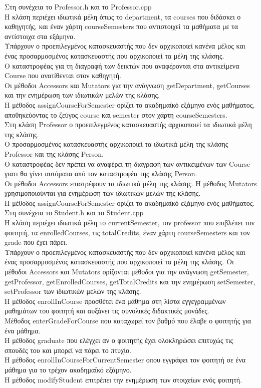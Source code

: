 \documentclass[12pt]{article}
\begin{document}
Στη συνέχεια το Professor.h και το Professor.cpp\\
Η κλάση περιέχει ιδιωτικά μέλη όπως το department, τα courses που διδάσκει ο καθηγητής, και έναν χάρτη courseSemesters που αντιστοιχεί τα μαθήματα με τα αντίστοιχα στα εξάμηνα.\\
Υπάρχουν ο προεπιλεγμένος κατασκευαστής που δεν αρχικοποιεί κανένα μέλος και ένας προσαρμοσμένος κατασκευαστής που αρχικοποιεί τα μέλη της κλάσης.\\
Ο καταστροφέας για τη διαγραφή των δεικτών που αναφέρονται στα αντικείμενα Course που ανατίθενται στον καθηγητή.\\
Οι μέθοδοι Accessors και Mutators για την ανάγνωση getDepartment, getCourses  και την ενημέρωση των ιδιωτικών μελών της κλάσης.\\
Η μέθοδος assignCourseForSemester ορίζει το ακαδημαϊκό εξάμηνο ενός μαθήματος, αποθηκεύοντας το ζεύγος course και semester στον χάρτη courseSemesters.\\
Στη κλάση Professor ο προεπιλεγμένος κατασκευαστής αρχικοποιεί τα ιδιωτικά μέλη της κλάσης.\\
Ο προσαρμοσμένος κατασκευαστής αρχικοποιεί τα ιδιωτικά μέλη της κλάσης Professor και της κλάσης Person.\\
Ο καταστροφέας δεν πρέπει να αναφέρει τη διαγραφή των αντικειμένων των Course γιατι θα γίνει αυτόματα από τον καταστροφέα της κλάσης Person.\\
Οι μέθοδοι Accessors επιστρέφουν τα ιδιωτικά μέλη της κλάσης.
Η μέθοδος Mutators χρησιμοποιούνται για ενημέρωση των ιδιωτικών μελών της κλάσης.\\
Η μέθοδος assignCourseForSemester ορίζει το ακαδημαϊκό εξάμηνο ενός μαθήματος.\\

Στη συνέχεια το Student.h και το Student.cpp\\
Η κλάση περιέχει ιδιωτικά μέλη το currentSemester, τον professor που επιβλέπει τον φοιτητή, τα enrolledCourses, τις totalCredits, έναν χάρτη courseSemesters και τον grade που έχει πάρει.\\
Υπάρχουν ο προεπιλεγμένος κατασκευαστής που δεν αρχικοποιεί κανένα μέλος και ένας προσαρμοσμένος κατασκευαστής που αρχικοποιεί τα μέλη της κλάσης.
Οι μέθοδοι Accessors και Mutators ορίζονται μέθοδοι για την ανάγνωση getSemester, getProfessor, getEnrolledCourses, getTotalCredits και την ενημέρωση setSemester, setProfessor των ιδιωτικών μελών της κλάσης.\\
Η μέθοδος enrollInCourse προσθέτει ένα μάθημα στη λίστα εγγεγραμμένων μαθημάτων του φοιτητή και αυξάνει τις συνολικές διδακτικές μονάδες.\\
Μέθοδος enterGradeForCourse που καταχωρεί τον βαθμό που έλαβε ο φοιτητής για ένα μάθημα.\\
Η μέθοδος graduate που ελέγχει αν ο φοιτητής έχει ολοκληρώσει επιτυχώς τις σπουδές του και μπορεί να πάρει το πτυχίο.\\
Η μέθοδος enrollInCourseForCurrentSemester οπου εγγράφει τον φοιτητή σε ένα μάθημα για το τρέχον ακαδημαϊκό εξάμηνο.\\
Η μέθοδος modifyStudent επιτρέπει την ενημέρωση των στοιχείων ενός φοιτητή.\\
\end{document}
